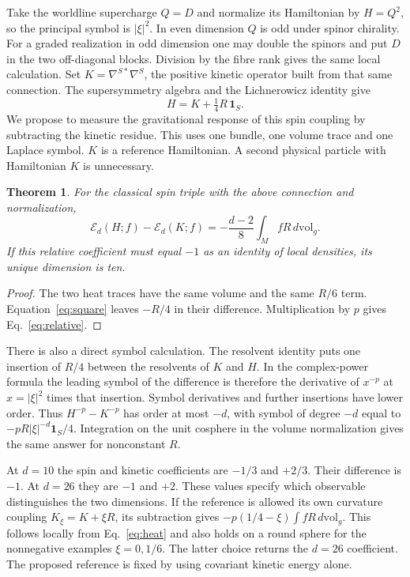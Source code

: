 \documentclass[aps,prd,reprint,onecolumn,nofootinbib,amsmath,amssymb]{revtex4-2}
\newtheorem{theorem}{Theorem}
\newcommand{\dv}{\,d\mathrm{vol}_g}
\begin{document}
Take the worldline supercharge \(Q=D\) and normalize its Hamiltonian by
\(H=Q^2\), so the principal symbol is \(\lvert\xi\rvert^2\).
In even dimension \(Q\) is odd under spinor chirality. For a graded
realization in odd dimension one may double the spinors and put \(D\) in the
two off-diagonal blocks. Division by the fibre rank gives the same local
calculation. Set \(K=\nabla^{S*}\nabla^S\), the positive kinetic operator
built from that same connection. The supersymmetry algebra and the
Lichnerowicz identity give
\begin{equation}
 H=K+\tfrac14 R\,\mathbf 1_S .
 \label{eq:square}
\end{equation}
We propose to measure the gravitational response of this spin coupling by
subtracting the kinetic residue. This uses one bundle, one volume trace
and one Laplace symbol. \(K\) is a reference Hamiltonian. A second physical
particle with Hamiltonian \(K\) is unnecessary.

\begin{theorem}\label{thm:relative}
For the classical spin triple with the above connection and normalization,
\begin{equation}
 \mathcal E_d(H;f)-\mathcal E_d(K;f)
 =-\frac{d-2}{8}\int_M fR\dv .
 \label{eq:relative}
\end{equation}
If this relative coefficient must equal \(-1\) as an identity of local
densities, its unique dimension is ten.
\end{theorem}
\begin{proof}
The two heat traces have the same volume and the same \(R/6\) term.
Equation~\eqref{eq:square} leaves \(-R/4\) in their difference.
Multiplication by \(p\) gives Eq.~\eqref{eq:relative}.
\end{proof}

There is also a direct symbol calculation. The resolvent identity puts
one insertion of \(R/4\) between the resolvents of \(K\) and \(H\).
In the complex-power formula the leading symbol of the difference is
therefore the derivative of \(x^{-p}\) at \(x=\lvert\xi\rvert^2\) times
that insertion. Symbol derivatives and further insertions have lower order.
Thus \(H^{-p}-K^{-p}\) has order at most \(-d\), with symbol of degree
\(-d\) equal to \(-p R\lvert\xi\rvert^{-d}\mathbf 1_S/4\).
Integration on the unit cosphere in the volume normalization gives the same
answer for nonconstant \(R\).

At \(d=10\) the spin and kinetic coefficients are \(-1/3\) and \(+2/3\).
Their difference is \(-1\). At \(d=26\) they are \(-1\) and \(+2\).
These values specify which observable distinguishes the two dimensions.
If the reference is allowed its own curvature coupling
\(K_\xi=K+\xi R\), its subtraction gives
\(-p(1/4-\xi)\int fR\dv\). This follows locally from Eq.~\eqref{eq:heat}
and also holds on a round sphere for the nonnegative examples
\(\xi=0,1/6\). The latter choice returns the \(d=26\) coefficient.
The proposed reference is fixed by using covariant kinetic energy alone.
\end{document}
